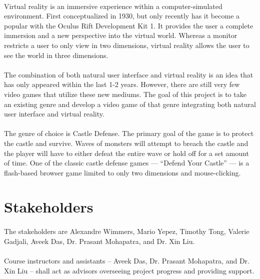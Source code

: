 \paragraph{} Virtual reality is an immersive experience within a computer-simulated environment. First conceptualized in 1930, but only recently has it become a popular with the Oculus Rift Development Kit 1. It provides the user a complete immersion and a new perspective into the virtual world. Whereas a monitor restricts a user to only view in two dimensions, virtual reality allows the user to see the world in three dimensions.

\paragraph{} The combination of both natural user interface and virtual reality is an idea that has only appeared within the last 1-2 years. However, there are still very few video games that utilize these new mediums. The goal of this project is to take an existing genre and develop a video game of that genre integrating both natural user interface and virtual reality. 

\paragraph{} The genre of choice is Castle Defense. The primary goal of the game is to protect the castle and survive. Waves of monsters will attempt to breach the castle and the player will have to either defeat the entire wave or hold off for a set amount of time. One of the classic castle defense games --- “Defend Your Castle” --- is a flash-based browser game limited to only two dimensions and mouse-clicking.


\section{Stakeholders}

\paragraph{} The stakeholders are Alexandre Wimmers, Mario Yepez, Timothy Tong, Valerie Gadjali, Aveek Das, Dr. Prasant Mohapatra, and Dr. Xin Liu. 

\paragraph{} Course instructors and assistants -- Aveek Das, Dr. Prasant Mohapatra, and Dr. Xin Liu --  shall act as advisors overseeing project progress and providing support.

